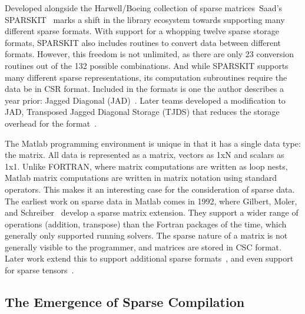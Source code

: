 Developed alongside the Harwell/Boeing collection of sparse matrices~\cite{duff1989sparse}Saad's SPARSKIT~\cite{saad1990sparskit} marks a shift in the library ecosystem towards supporting many different sparse formats. 
With support for a whopping twelve sparse storage formats, SPARSKIT also includes routines to convert data between different formats. 
However, this freedom is not unlimited, as there are only 23 conversion routines out of the 132 possible combinations. 
And while SPARSKIT supports many different sparse representations, its computation subroutines require the data be in CSR format. 
Included in the formats is one the author describes a year prior: Jagged Diagonal (JAD)~\cite{saad1989krylov}.
Later teams developed a modification to JAD, Transposed Jagged Diagonal Storage (TJDS) that reduces the storage overhead for the format~\cite{montagne2004optimal}.


The Matlab programming environment is unique in that it has a single data type: the matrix. 
All data is represented as a matrix, vectors as 1xN and scalars as 1x1.
Unlike FORTRAN, where matrix computations are written as loop nests, Matlab matrix computations are written in matrix notation using standard operators.
This makes it an interesting case for the consideration of sparse data.
The earliest work on sparse data in Matlab comes in 1992, where Gilbert, Moler, and Schreiber~\cite{gilbert1992sparse} develop a sparse matrix extension.
They support a wider range of operations (addition, transpose) than the Fortran packages of the time, which generally only supported running solvers. 
The sparse nature of a matrix is not generally visible to the programmer, and matrices are stored in CSC format.
Later work extend this to support additional sparse formats~\cite{kawabata2004matlab}, and even support for sparse tensors~\cite{bader2008efficient}.



\cite{bouaricha1994tensor} 
\cite{bouaricha1999tensor}
\cite{lin2002efficient}
\cite{kolda2008scalable}

\cite{irwin1997aspect}



\subsection{The Emergence of Sparse Compilation}


